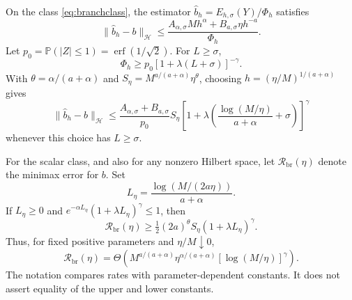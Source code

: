 \begin{theorem}
\label{thm:branchrecovery}
On the class \eqref{eq:branchclass}, the estimator
$\widehat b_h=E_{h,\sigma}(Y)/\Phi_h$ satisfies
\begin{equation}\label{eq:brancherror}
 \|\widehat b_h-b\|_{\mathcal H}
 \le\frac{A_{\alpha,\sigma}Mh^\alpha+
                B_{a,\sigma}\eta h^{-a}}{\Phi_h}.
\end{equation}
Let $p_0=\mathbb P(|Z|\le1)=\operatorname{erf}(1/\sqrt2)$.
For $L\ge\sigma$,
\begin{equation}\label{eq:branchresponselower}
 \Phi_h\ge p_0[1+\lambda(L+\sigma)]^{-\gamma}.
\end{equation}
With $\theta=\alpha/(a+\alpha)$ and
$S_\eta=M^{a/(a+\alpha)}\eta^\theta$, choosing
$h=(\eta/M)^{1/(a+\alpha)}$ gives
\begin{equation}\label{eq:branchupperrate}
 \|\widehat b_h-b\|_{\mathcal H}
 \le\frac{A_{\alpha,\sigma}+B_{a,\sigma}}{p_0}
 S_\eta
 \left[1+\lambda\left(\frac{\log(M/\eta)}{a+\alpha}
                         +\sigma\right)\right]^\gamma
\end{equation}
whenever this choice has $L\ge\sigma$.

For the scalar class, and also for any nonzero Hilbert space, let
$\mathcal R_{\mathrm{br}}(\eta)$ denote the minimax error for $b$.
Set
\[
 L_\eta=\frac{\log(M/(2a\eta))}{a+\alpha}.
\]
If $L_\eta\ge0$ and
$e^{-\alpha L_\eta}(1+\lambda L_\eta)^\gamma\le1$, then
\begin{equation}\label{eq:branchlowerrate}
 \mathcal R_{\mathrm{br}}(\eta)
 \ge\tfrac12(2a)^\theta S_\eta
                  (1+\lambda L_\eta)^\gamma.
\end{equation}
Thus, for fixed positive parameters and $\eta/M\downarrow0$,
\begin{equation}\label{eq:branchminimax}
 \mathcal R_{\mathrm{br}}(\eta)
 =\Theta\!\left(
 M^{a/(a+\alpha)}\eta^{\alpha/(a+\alpha)}
 [\log(M/\eta)]^\gamma\right).
\end{equation}
The notation compares rates with parameter-dependent constants. It does not
assert equality of the upper and lower constants.
\end{theorem}

